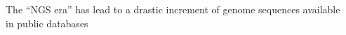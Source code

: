 \documentclass[10pt]{beamer}
\begin{document}
\begin{frame}
\begin{overlayarea}{\textwidth}{\textheight}
{{\begin{columns}
\begin{column}{0.6\textwidth}
\begin{center}
			\end{center}
		\end{column}
		\begin{column}{0.4\textwidth}
			\normalsize{%
			The ``NGS era'' has lead to a drastic increment of genome sequences available in public databases
			}	
		\end{column}		
	\end{columns}
	}
	}
	\end{overlayarea}
\end{frame}
\end{document}

